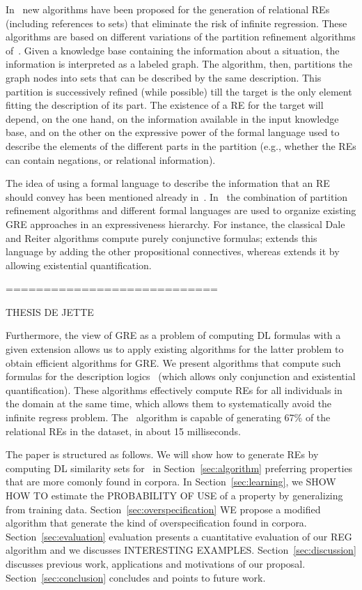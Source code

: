In~\cite{arec:refe08,arec:usin11} new algorithms have been proposed for the generation 
of relational REs (including references to sets) that eliminate the risk of infinite regression. 
These algorithms are based on different variations of the partition refinement algorithms of~\cite{paig:thre87}.
Given a knowledge base containing the information about a situation, the information is 
interpreted as a labeled graph.  The algorithm, then, partitions the graph nodes into sets that can 
be described by the same description.  This partition is successively refined (while possible) till the target 
is the only element fitting the description of its part.  The existence of a RE for the target will 
depend, on the one hand, on the information available in the input knowledge base, and on the other 
on the expressive power of the formal language used to describe the elements of the different 
parts in the partition (e.g., whether the REs can contain negations, or relational information). 

The idea of using a formal language to describe the information that an RE should convey has been mentioned
already in~\cite{Krahmer2003,gardent07:_gener_bridg_defin_descr}.  In~\cite{arec:refe08,arec:usin11} the 
combination of partition refinement algorithms and different formal languages are used to organize existing 
GRE approaches in an expressiveness hierarchy.  For instance, the classical Dale and Reiter algorithms
compute purely conjunctive formulas; \cite{deemter02:_gener_refer_expres} extends this language by
adding the other propositional connectives, whereas\cite{dale91:_gener_refer_expres_invol_relat} extends it by
allowing existential quantification.


============================

THESIS DE JETTE


Furthermore, the view of GRE as a problem of computing DL formulas
with a given extension allows us to apply existing algorithms for the
latter problem to obtain efficient algorithms for GRE.  We present
algorithms that compute such formulas for the description logics \el\
(which allows only conjunction and existential quantification).  These algorithms effectively
compute REs for all individuals in the domain at the same time, which
allows them to systematically avoid the infinite regress problem.  The
\el\ algorithm is capable of generating 67\% of the relational REs in
the \cite{viethen06:_algor_for_gener_refer_expres} dataset, in about
15 milliseconds.  


The paper is structured as follows. We will show how to generate REs by computing DL similarity sets for  \el\ in Section~\ref{sec:algorithm} preferring properties that are more comonly found in corpora.  In Section~\ref{sec:learning}, we SHOW HOW TO estimate the 
PROBABILITY OF USE of a property by generalizing from training data. Section~\ref{sec:overspecification}
WE propose a modified algorithm that generate the kind of overspecification found in corpora. Section~\ref{sec:evaluation} evaluation presents a cuantitative evaluation of our REG algorithm and we discusses INTERESTING EXAMPLES. Section~\ref{sec:discussion} discusses previous work, applications and motivations of our proposal. Section~\ref{sec:conclusion} concludes and points to future work.

